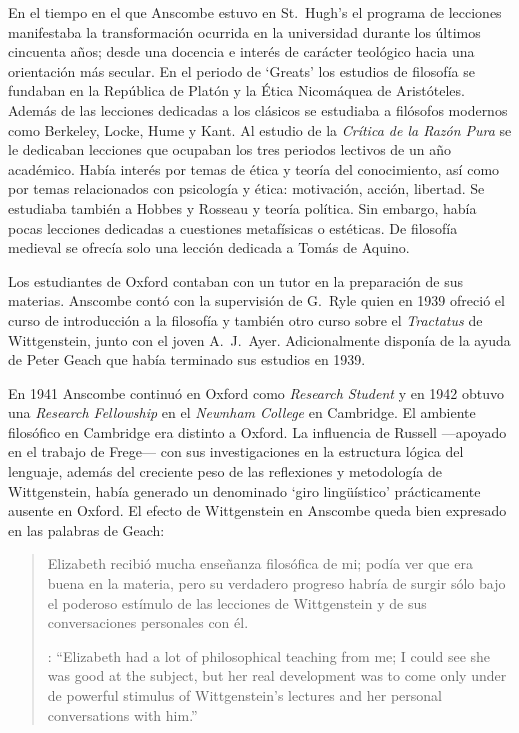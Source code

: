 En el tiempo en el que Anscombe estuvo en St.~Hugh's el programa de lecciones manifestaba la transformación ocurrida en la universidad durante los últimos cincuenta años; desde una docencia e interés de carácter teológico hacia una orientación más secular. En el periodo de `Greats' los estudios de filosofía se fundaban en la República de Platón y la Ética Nicomáquea de Aristóteles. Además de las lecciones dedicadas a los clásicos se estudiaba a filósofos modernos como Berkeley, Locke, Hume y Kant. Al estudio de la \emph{Crítica de la Razón Pura} se le dedicaban lecciones que ocupaban los tres periodos lectivos de un año académico. Había interés por temas de ética y teoría del conocimiento, así como por temas relacionados con psicología y ética: motivación, acción, libertad. Se estudiaba también a Hobbes y Rosseau y teoría política. Sin embargo, había pocas lecciones dedicadas a cuestiones metafísicas o estéticas. De filosofía medieval se ofrecía solo una lección dedicada a Tomás de Aquino.\autocite[Cf.~][23--24]{torralba2005accion}

Los estudiantes de Oxford contaban con un tutor en la preparación de sus materias. Anscombe contó con la supervisión de G.~Ryle quien en 1939 ofreció el curso de introducción a la filosofía y también otro curso sobre el \emph{Tractatus} de Wittgenstein, junto con el joven A.~J.~Ayer. Adicionalmente disponía de la ayuda de Peter Geach que había terminado sus estudios en 1939.\autocite[Cf.~][24]{torralba2005accion}

En 1941 Anscombe continuó en Oxford como \emph{Research Student} y en 1942 obtuvo una \emph{Research Fellowship} en el \emph{Newnham College} en Cambridge. El ambiente filosófico en Cambridge era distinto a Oxford. La influencia de Russell ---apoyado en el trabajo de Frege--- con sus investigaciones en la estructura lógica del lenguaje, además del creciente peso de las reflexiones y metodología de Wittgenstein, había generado un denominado `giro lingüístico'\autocite[Cf.~][14]{geach1991philaut} prácticamente ausente en Oxford. El efecto de Wittgenstein en Anscombe queda bien expresado en las palabras de Geach: \blockquote[{\cite[11]{geach1991philaut}}: \enquote{Elizabeth had a lot of philosophical teaching from me; I could see she was good at the subject, but her real development was to come only under de powerful stimulus of Wittgenstein's lectures and her personal conversations with him.}]{Elizabeth recibió mucha enseñanza filosófica de mi; podía ver que era buena en la materia, pero su verdadero progreso habría de surgir sólo bajo el poderoso estímulo de las lecciones de Wittgenstein y de sus conversaciones personales con él.}

